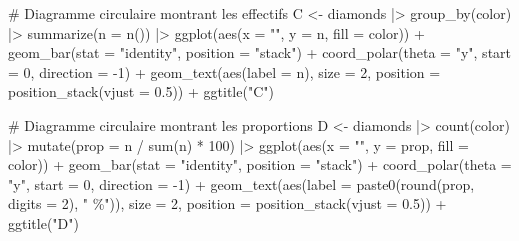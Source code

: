 \documentclass[
  letterpaper,
]{book}
\newenvironment{Shaded}{\begin{snugshade}}{\end{snugshade}}
\newcommand{\AttributeTok}[1]{\textcolor[rgb]{0.40,0.45,0.13}{#1}}
\newcommand{\CommentTok}[1]{\textcolor[rgb]{0.37,0.37,0.37}{#1}}
\newcommand{\DecValTok}[1]{\textcolor[rgb]{0.68,0.00,0.00}{#1}}
\newcommand{\FloatTok}[1]{\textcolor[rgb]{0.68,0.00,0.00}{#1}}
\newcommand{\FunctionTok}[1]{\textcolor[rgb]{0.28,0.35,0.67}{#1}}
\newcommand{\NormalTok}[1]{\textcolor[rgb]{0.00,0.23,0.31}{#1}}
\newcommand{\OtherTok}[1]{\textcolor[rgb]{0.00,0.23,0.31}{#1}}
\newcommand{\SpecialCharTok}[1]{\textcolor[rgb]{0.37,0.37,0.37}{#1}}
\newcommand{\StringTok}[1]{\textcolor[rgb]{0.13,0.47,0.30}{#1}}
\begin{document}
\begin{Shaded}
\begin{Highlighting}[]
\CommentTok{\# Diagramme circulaire montrant les effectifs}
\NormalTok{C }\OtherTok{\textless{}{-}}
\NormalTok{  diamonds }\SpecialCharTok{|\textgreater{}}
  \FunctionTok{group\_by}\NormalTok{(color) }\SpecialCharTok{|\textgreater{}}
  \FunctionTok{summarize}\NormalTok{(}\AttributeTok{n =} \FunctionTok{n}\NormalTok{()) }\SpecialCharTok{|\textgreater{}}
  \FunctionTok{ggplot}\NormalTok{(}\FunctionTok{aes}\NormalTok{(}\AttributeTok{x =} \StringTok{""}\NormalTok{, }\AttributeTok{y =}\NormalTok{ n, }\AttributeTok{fill =}\NormalTok{ color)) }\SpecialCharTok{+}
  \FunctionTok{geom\_bar}\NormalTok{(}\AttributeTok{stat =} \StringTok{"identity"}\NormalTok{, }\AttributeTok{position =} \StringTok{"stack"}\NormalTok{) }\SpecialCharTok{+}
  \FunctionTok{coord\_polar}\NormalTok{(}\AttributeTok{theta =} \StringTok{"y"}\NormalTok{,}
              \AttributeTok{start =} \DecValTok{0}\NormalTok{,}
              \AttributeTok{direction =} \SpecialCharTok{{-}}\DecValTok{1}\NormalTok{) }\SpecialCharTok{+}
  \FunctionTok{geom\_text}\NormalTok{(}\FunctionTok{aes}\NormalTok{(}\AttributeTok{label =}\NormalTok{ n),}
            \AttributeTok{size =} \DecValTok{2}\NormalTok{,}
            \AttributeTok{position =} \FunctionTok{position\_stack}\NormalTok{(}\AttributeTok{vjust =} \FloatTok{0.5}\NormalTok{)) }\SpecialCharTok{+}
  \FunctionTok{ggtitle}\NormalTok{(}\StringTok{"C"}\NormalTok{)}

\CommentTok{\# Diagramme circulaire montrant les proportions}
\NormalTok{D }\OtherTok{\textless{}{-}}
\NormalTok{  diamonds }\SpecialCharTok{|\textgreater{}}
  \FunctionTok{count}\NormalTok{(color) }\SpecialCharTok{|\textgreater{}}
  \FunctionTok{mutate}\NormalTok{(}\AttributeTok{prop =}\NormalTok{ n }\SpecialCharTok{/} \FunctionTok{sum}\NormalTok{(n) }\SpecialCharTok{*} \DecValTok{100}\NormalTok{) }\SpecialCharTok{|\textgreater{}}
  \FunctionTok{ggplot}\NormalTok{(}\FunctionTok{aes}\NormalTok{(}\AttributeTok{x =} \StringTok{""}\NormalTok{, }\AttributeTok{y =}\NormalTok{ prop, }\AttributeTok{fill =}\NormalTok{ color)) }\SpecialCharTok{+}
  \FunctionTok{geom\_bar}\NormalTok{(}\AttributeTok{stat =} \StringTok{"identity"}\NormalTok{, }\AttributeTok{position =} \StringTok{"stack"}\NormalTok{) }\SpecialCharTok{+}
  \FunctionTok{coord\_polar}\NormalTok{(}\AttributeTok{theta =} \StringTok{"y"}\NormalTok{,}
              \AttributeTok{start =} \DecValTok{0}\NormalTok{,}
              \AttributeTok{direction =} \SpecialCharTok{{-}}\DecValTok{1}\NormalTok{) }\SpecialCharTok{+}
  \FunctionTok{geom\_text}\NormalTok{(}\FunctionTok{aes}\NormalTok{(}\AttributeTok{label =} \FunctionTok{paste0}\NormalTok{(}\FunctionTok{round}\NormalTok{(prop, }\AttributeTok{digits =} \DecValTok{2}\NormalTok{), }\StringTok{" \%"}\NormalTok{)),}
            \AttributeTok{size =} \DecValTok{2}\NormalTok{,}
            \AttributeTok{position =} \FunctionTok{position\_stack}\NormalTok{(}\AttributeTok{vjust =} \FloatTok{0.5}\NormalTok{)) }\SpecialCharTok{+}
  \FunctionTok{ggtitle}\NormalTok{(}\StringTok{"D"}\NormalTok{)}
\end{Highlighting}
\end{Shaded}
\end{document}
